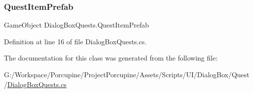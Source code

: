 \subsubsection{\texorpdfstring{Quest\+Item\+Prefab}{QuestItemPrefab}}
{\footnotesize\ttfamily Game\+Object Dialog\+Box\+Quests.\+Quest\+Item\+Prefab}



Definition at line 16 of file Dialog\+Box\+Quests.\+cs.



The documentation for this class was generated from the following file\+:\begin{DoxyCompactItemize}
\item 
G\+:/\+Workspace/\+Porcupine/\+Project\+Porcupine/\+Assets/\+Scripts/\+U\+I/\+Dialog\+Box/\+Quest/\hyperlink{_dialog_box_quests_8cs}{Dialog\+Box\+Quests.\+cs}\end{DoxyCompactItemize}

